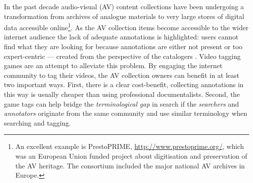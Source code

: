 In the past decade audio-visual (AV) content collections have been undergoing a transformation from archives of analogue materials to very large stores of digital data accessible online\footnote{An excellent example is PrestoPRIME, \url{http://www.prestoprime.org/}, which was an European Union funded project about digitisation and preservation of the AV heritage. The consortium included the major national AV archives in Europe.}.  As the AV collection items become accessible to the wider internet audience the lack of adequate annotations is highlighted: users cannot find what they are looking for because annotations are either not present or too expert-centric --- created from the perspective of the catalogers \cite{johan-book-chap}. Video tagging games are an attempt to alleviate this problem. By engaging the internet community to tag their videos, the AV collection owners can benefit in at least two important ways. First, there is a clear cost-benefit, collecting annotations in this way is usually cheaper than using professional documentalists. Second, the game tags can help bridge the \textit{terminological gap} in search if the \textit{searchers} and \textit{annotators} originate from the same community and use similar terminology when searching and tagging. 

